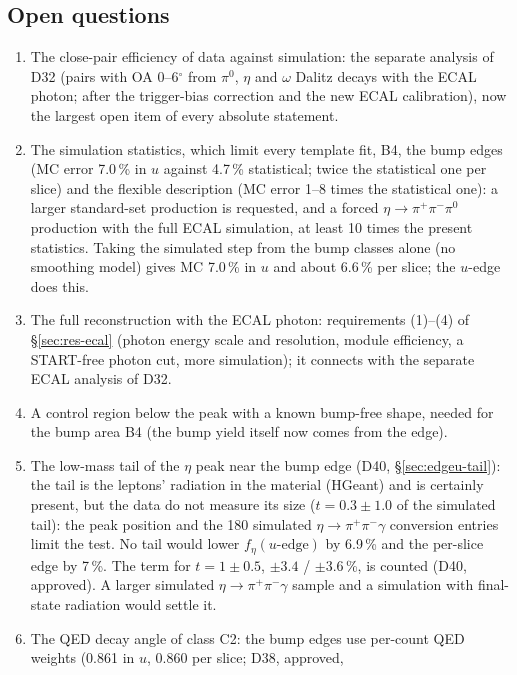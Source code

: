 \documentclass[11pt,a4paper]{article}
\newcommand{\piz}{\ensuremath{\pi^{0}}\xspace}
\newcommand{\pipi}{\ensuremath{\pi^{+}\pi^{-}}\xspace}
\begin{document}
\subsection{Open questions}
\label{sec:res-open}
\begin{enumerate}\setlength{\itemsep}{1pt}
\item The close-pair efficiency of data against simulation: the separate analysis of D32 (pairs with OA 0--6$^\circ$ from \piz, $\eta$ and
      $\omega$ Dalitz decays with the ECAL photon; after the trigger-bias correction and the new ECAL calibration), now the largest open item of
      every absolute statement.
\item The simulation statistics, which limit every template fit, B4, the bump edges (MC error 7.0\,\% in $u$ against 4.7\,\% statistical; twice
      the statistical one per slice) and the flexible description (MC error 1--8 times the statistical one): a larger standard-set production
      is requested, and a forced $\eta\to\pipi\piz$ production with the full ECAL simulation, at least 10 times the present statistics. Taking
      the simulated step from the bump classes alone (no smoothing model) gives MC 7.0\,\% in $u$ and about 6.6\,\% per slice; the $u$-edge does
      this.
\item The full reconstruction with the ECAL photon: requirements (1)--(4) of \S\ref{sec:res-ecal} (photon energy scale and resolution, module
      efficiency, a START-free photon cut, more simulation); it connects with the separate ECAL analysis of D32.
\item A control region below the peak with a known bump-free shape, needed for the bump area B4 (the bump yield itself now comes from the edge).
\item The low-mass tail of the $\eta$ peak near the bump edge (D40, \S\ref{sec:edgeu-tail}): the tail is the leptons' radiation in the
      material (HGeant) and is certainly present, but the data do not measure its size ($t=0.3\pm1.0$ of the simulated tail): the peak position
      and the 180 simulated $\eta\to\pipi\gamma$ conversion entries limit the test. No tail would lower $f_\eta(u\text{-edge})$ by 6.9\,\% and the
      per-slice edge by 7\,\%. The term for $t=1\pm0.5$, $\pm3.4$ / $\pm3.6$\,\%, is counted (D40, approved). A larger simulated $\eta\to\pipi\gamma$ sample and a simulation
      with final-state radiation would settle it.
\item The QED decay angle of class C2: the bump edges use per-count QED weights (0.861 in $u$, 0.860 per slice; D38, approved,

\end{enumerate}
\end{document}
